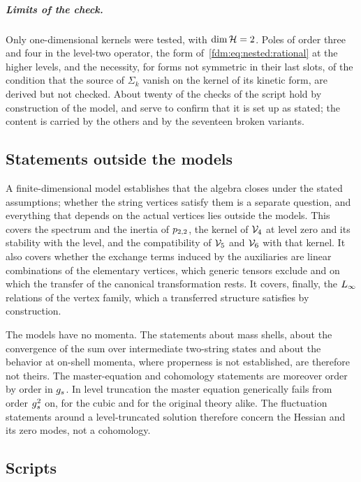 \subparagraph{Limits of the check.}
Only one-dimensional kernels were tested, with $\dim \mathcal{H} = 2$.
Poles of order three and four in the level-two operator, the form of~\eqref{fdm:eq:nested:rational} at the higher levels, and the necessity, for forms not symmetric in their last slots, of the condition that the source of $\Sigma_k$ vanish on the kernel of its kinetic form, are derived but not checked.
About twenty of the checks of the script hold by construction of the model, and serve to confirm that it is set up as stated; the content is carried by the others and by the seventeen broken variants.

\subsection{Statements outside the models}
\label{fdm:sec:outside}

A finite-dimensional model establishes that the algebra closes under the stated assumptions; whether the string vertices satisfy them is a separate question, and everything that depends on the actual vertices lies outside the models.
This covers the spectrum and the inertia of $p_{2,2}$, the kernel of $\mathcal{V}_{4}$ at level zero and its stability with the level, and the compatibility of $\mathcal{V}_{5}$ and $\mathcal{V}_{6}$ with that kernel.
It also covers whether the exchange terms induced by the auxiliaries are linear combinations of the elementary vertices, which generic tensors exclude and on which the transfer of the canonical transformation rests.
It covers, finally, the $L_\infty$ relations of the vertex family, which a transferred structure satisfies by construction.

The models have no momenta.
The statements about mass shells, about the convergence of the sum over intermediate two-string states and about the behavior at on-shell momenta, where properness is not established, are therefore not theirs.
The master-equation and cohomology statements are moreover order by order in $g_s$.
In level truncation the master equation generically fails from order $g_s^2$ on, for the cubic and for the original theory alike.
The fluctuation statements around a level-truncated solution therefore concern the Hessian and its zero modes, not a cohomology.

\subsection{Scripts}
\label{fdm:sec:scripts}

